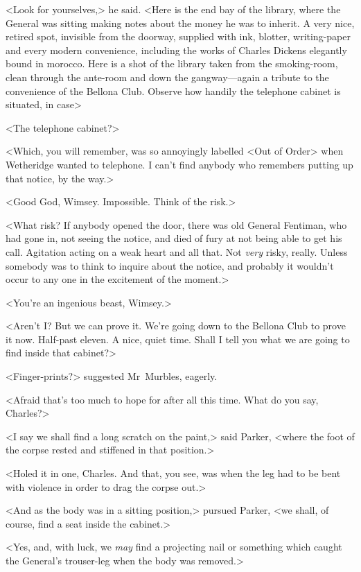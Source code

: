<Look for yourselves,> he said. <Here is the end bay of the library, where the General was sitting making notes about the money he was to inherit. A very nice, retired spot, invisible from the doorway, supplied with ink, blotter, writing-paper and every modern convenience, including the works of Charles Dickens elegantly bound in morocco. Here is a shot of the library taken from the smoking-room, clean through the ante-room and down the gangway—again a tribute to the convenience of the Bellona Club. Observe how handily the telephone cabinet is situated, in case\longdash>

<The telephone cabinet?>

<Which, you will remember, was so annoyingly labelled <Out of Order> when Wetheridge wanted to telephone. I can't find anybody who remembers putting up that notice, by the way.>

<Good God, Wimsey. Impossible. Think of the risk.>

<What risk? If anybody opened the door, there was old General Fentiman, who had gone in, not seeing the notice, and died of fury at not being able to get his call. Agitation acting on a weak heart and all that. Not \emph{very} risky, really. Unless somebody was to think to inquire about the notice, and probably it wouldn't occur to any one in the excitement of the moment.>

<You're an ingenious beast, Wimsey.>

<Aren't I\@? But we can prove it. We're going down to the Bellona Club to prove it now. Half-past eleven. A nice, quiet time. Shall I tell you what we are going to find inside that cabinet?>

<Finger-prints?> suggested Mr~Murbles, eagerly.

<Afraid that's too much to hope for after all this time. What do you say, Charles?>

<I say we shall find a long scratch on the paint,> said Parker, <where the foot of the corpse rested and stiffened in that position.>

<Holed it in one, Charles. And that, you see, was when the leg had to be bent with violence in order to drag the corpse out.>

<And as the body was in a sitting position,> pursued Parker, <we shall, of course, find a seat inside the cabinet.>

<Yes, and, with luck, we \emph{may} find a projecting nail or something which caught the General's trouser-leg when the body was removed.>

